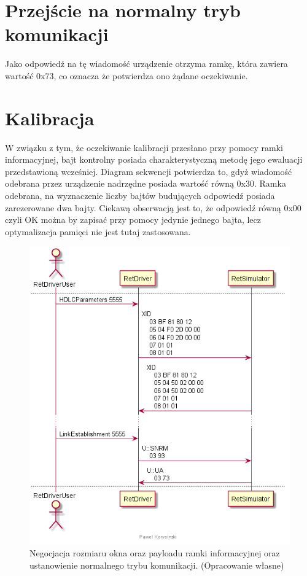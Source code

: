     \section{Przejście na normalny tryb komunikacji}
    Jako odpowiedź na tę wiadomość urządzenie otrzyma ramkę, która zawiera wartość 0x73, co oznacza że 
    potwierdza ono żądane oczekiwanie.

    \section{Kalibracja}
    W związku z tym, że oczekiwanie kalibracji przesłano przy pomocy ramki informacyjnej, bajt kontrolny posiada
    charakterystyczną metodę jego ewaluacji przedstawioną wcześniej. Diagram sekwencji
    potwierdza to, gdyż wiadomość odebrana przez urządzenie nadrzędne posiada wartość równą 0x30.
    Ramka odebrana, na wyznaczenie liczby bajtów budujących odpowiedź posiada zarezerowane dwa bajty. 
    Ciekawą obserwacją jest to, że odpowiedź równą 0x00 czyli OK można by zapisać przy pomocy jedynie jednego bajta, lecz optymalizacja
    pamięci nie jest tutaj zastosowana.

    \begin{figure}[h!]
    \centering
    \includegraphics[scale=0.75]{out/Diagramy/UML_DiagramOfSequence_New/KalibracjaRETa-page3.png}
    \caption{Negocjacja rozmiaru okna oraz payloadu ramki informacyjnej oraz ustanowienie normalnego trybu komunikacji.
        \newline(Opracowanie własne)}
    \end{figure}

